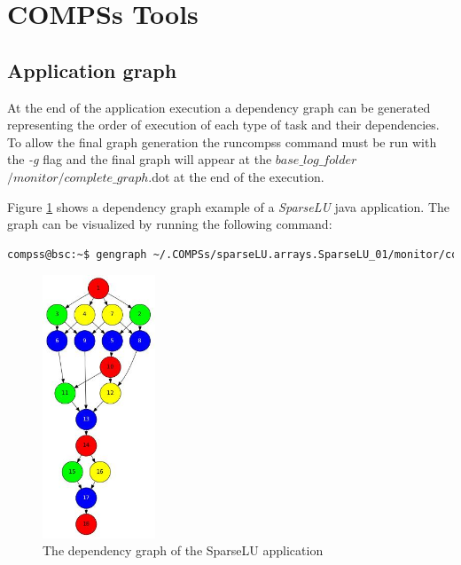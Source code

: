 \section{COMPSs Tools}
\label{sec:Tools}

\subsection{Application graph}
At the end of the application execution a dependency graph can be generated representing the order of execution of each type of 
task and their dependencies. To allow the final graph generation the runcompss command must be run with the \textit{-g} flag 
and the final graph will appear at the \textit{$base\_log\_folder$}$/monitor/complete\_graph$.dot at the end of the execution.

Figure \ref{fig:complete_graph} shows a dependency graph example of a \textit{SparseLU} java application. The graph can be
visualized by running the following command:
\begin{lstlisting}[language=bash]
compss@bsc:~$ gengraph ~/.COMPSs/sparseLU.arrays.SparseLU_01/monitor/complete_graph.dot
\end{lstlisting}

\begin{figure}[h!]
  \centering
    \includegraphics[width=0.3\textwidth]{./Sections/4_Tools/Figures/dependency_graph.jpeg}
    \caption{The dependency graph of the SparseLU application}
    \label{fig:complete_graph}
\end{figure}




